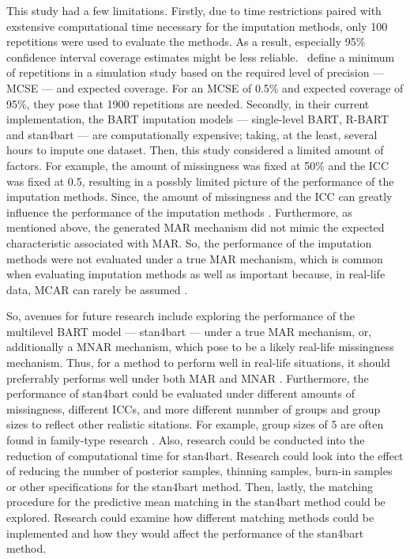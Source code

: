\documentclass[preprint,12pt]{elsarticle}
\begin{document}
This study had a few limitations. Firstly, due to time restrictions paired with exstensive computational time necessary for the imputation methods, only 100 repetitions were used to evaluate the methods. As a result, especially 95\% confidence interval coverage estimates might be less reliable.~\citet{morris2019} define a minimum of repetitions in a simulation study based on the required level of precision --- MCSE --- and expected coverage. For an  MCSE of 0.5\% and expected coverage of 95\%, they pose that 1900 repetitions are needed. Secondly, in their current implementation, the BART imputation models --- single-level BART, R-BART and stan4bart --- are computationally expensive; taking, at the least, several hours to impute one dataset. Then, this study considered a limited amount of factors. For example, the amount of missingness was fixed at 50\% and the ICC was fixed at 0.5, resulting in a possbly limited picture of the performance of the imputation methods. Since, the amount of missingness and the ICC can greatly influence the performance of the imputation methods \citep{enders2018,enders2018a,enders2020,mistler2017,akkayahocagil2023,grund2016,grund2018a,grund2018,ludtke2017,grund2021}. Furthermore, as mentioned above, the generated MAR mechanism did not mimic the expected characteristic associated with MAR. So, the performance of the imputation methods were not evaluated under a true MAR mechanism, which is common when evaluating imputation methods \citep{buurenFlexibleImputationMissing2018,enders2018a,peeters2015,austin2021,carpenter2013,little2002,grund2018,ludtke2017,grund2021,schouten2021} as well as important because, in real-life data, MCAR can rarely be assumed \citep{oberman2023,buurenFlexibleImputationMissing2018,kang2013,little2002}.

So, avenues for future research include exploring the performance of the multilevel BART model --- stan4bart --- under a true MAR mechanism, or, additionally a MNAR mechanism, which \citet{oberman2023} pose to be a likely real-life missingness mechanism. Thus, for a method to perform well in real-life situations, it should preferrably performs well under both MAR and MNAR \citep{oberman2023}. Furthermore, the performance of stan4bart could be evaluated under different amounts of missingness, different ICCs, and more different nunmber of groups and group sizes to reflect other realistic sitations. For example, group sizes of 5 are often found in family-type research \citep{maas2005}. Also, research could be conducted into the reduction of computational time for stan4bart. Research could look into the effect of reducing the number of posterior samples, thinning samples, burn-in samples or other specifications for the stan4bart method. Then, lastly, the matching procedure for the predictive mean matching in the stan4bart method could be explored. Research could examine how different matching methods \citep{buurenFlexibleImputationMissing2018} could be implemented and how they would affect the performance of the stan4bart method.
\end{document}
